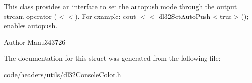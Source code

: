 This class provides an interface to set the autopush mode through the output stream operator ($<$$<$). For example\-: cout $<$$<$ dl32\-Set\-Auto\-Push$<$true$>$(); enables autopush. 

\begin{DoxyAuthor}{Author}
Manu343726 
\end{DoxyAuthor}


The documentation for this struct was generated from the following file\-:\begin{DoxyCompactItemize}
\item 
code/headers/utils/dl32\-Console\-Color.\-h\end{DoxyCompactItemize}
